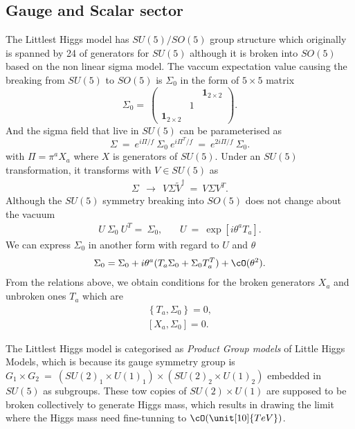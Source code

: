 \subsection*{Gauge and Scalar sector}
The Littlest Higgs model has $SU(5)/SO(5)$ group structure
which originally is spanned by 24 of generators for $SU(5)$ although it is broken into $SO(5)$ based on the non linear sigma model. 
The vaccum expectation value causing the breaking from $SU(5)$ to $SO(5)$ is
$\Sigma_0$ in the form of $5\times5$ matrix
 \begin{equation}
 \Sigma_0 =  ~ \left( \begin{array}{ccc}
  &  & {\mathbf{1}}_{2 \times 2} \\
  & 1 &  \\
  {\mathbf{1}}_{2 \times 2} &  & 
  \end{array}\right).
  \end{equation}
  And the sigma field that live in $SU(5)$ can be parameterised as
 \begin{equation}
 \Sigma ~=~ e^{i\Pi/f}~\Sigma_0~e^{i\Pi^T/f}~=~ e^{2i\Pi/f}~\Sigma_0. 
 \end{equation}
  with $\Pi=\pi^a X_a$ where $X$ is generators of $SU(5)$.
 Under an $SU(5)$ transformation, it transforms with $V \in SU(5)$ as
  \begin{align}
  \Sigma ~~\to ~~ V \Sigma \tilde{V}^\dagger ~=~V\Sigma V^T .
  \end{align}
 Although the $SU(5)$ symmetry breaking into $SO(5)$ does not change about the vacuum 
 \begin{align}
  U ~\Sigma_0~ U^T = ~\Sigma_0, ~~~~~~~~ U~=~\exp[i\theta^a T_a]. \nonumber
 \end{align}
 We can express $\Sigma_0$ in another form with regard to $U$ and $\theta$ 
 \begin{align}
  \Sigma_0 = \Sigma_0 + i\theta^a (T_a \Sigma_0 + \Sigma_0 T_a^T ) + \cO(\theta^2).
 \end{align}
From the relations above, we obtain conditions for the broken generators $X_a$ and unbroken ones $T_a$ which are
\begin{align}
 \left\{ T_a, \Sigma_0 \right\} =0, \\
 \left[ X_a, \Sigma_0 \right] =0. 
\end{align}


The Littlest Higgs model is categorised as \emph{Product Group models} of Little Higgs Models, which is because
 its gauge symmetry group is $ G_1\times G_2 ~=~ (SU(2)_1\times U(1)_1)\times (SU(2)_2\times U(1)_2)$ embedded in $SU(5)$ as subgroups. 
 These tow copies of $SU(2)\times U(1)$ are supposed to be broken collectively to generate Higgs mass, 
 which results in drawing the limit where the Higgs mass need fine-tunning to $\cO(\unit[10]{TeV})$. 

